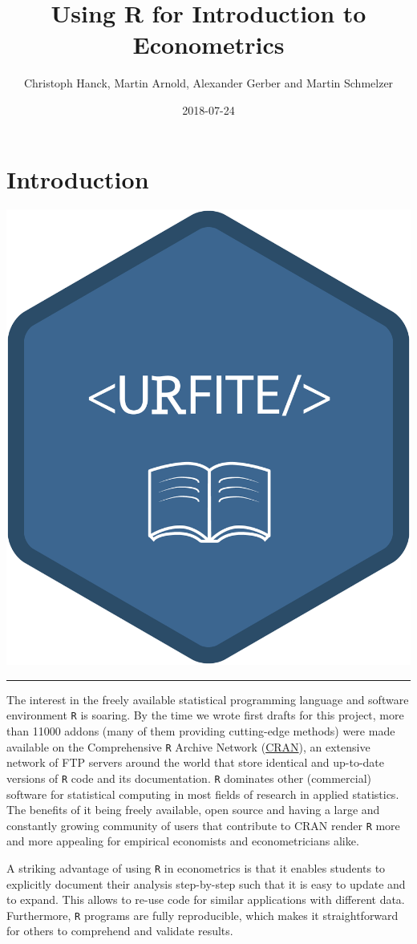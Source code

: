 \documentclass[]{book}
\title{Using R for Introduction to Econometrics}
\author{Christoph Hanck, Martin Arnold, Alexander Gerber and Martin Schmelzer}
\date{2018-07-24}
\theoremstyle{definition}
\theoremstyle{definition}
\theoremstyle{definition}
\theoremstyle{remark}
\begin{document}
\maketitle

{
\setcounter{tocdepth}{1}
\tableofcontents
}
\chapter{Introduction}\label{introduction}

\begin{center}\includegraphics[width=0.45\linewidth]{images/URFITE_logo} \end{center}

\noindent\rule{\textwidth}{1pt}

The interest in the freely available statistical programming language
and software environment \texttt{R} \citep{R-base} is soaring. By the
time we wrote first drafts for this project, more than 11000 addons
(many of them providing cutting-edge methods) were made available on the
Comprehensive \texttt{R} Archive Network
(\href{https://cran.r-project.org/}{CRAN}), an extensive network of FTP
servers around the world that store identical and up-to-date versions of
\texttt{R} code and its documentation. \texttt{R} dominates other
(commercial) software for statistical computing in most fields of
research in applied statistics. The benefits of it being freely
available, open source and having a large and constantly growing
community of users that contribute to CRAN render \texttt{R} more and
more appealing for empirical economists and econometricians alike.

A striking advantage of using \texttt{R} in econometrics is that it
enables students to explicitly document their analysis step-by-step such
that it is easy to update and to expand. This allows to re-use code for
similar applications with different data. Furthermore, \texttt{R}
programs are fully reproducible, which makes it straightforward for
others to comprehend and validate results.
\end{document}
